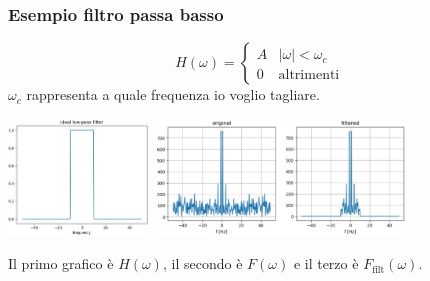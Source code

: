 \documentclass[12pt, a4paper]{report}
\begin{document}
\subsubsection{Esempio filtro passa basso}
\begin{equation*}
    H(\omega)=
    \begin{cases}
        A & \lvert \omega \rvert < \omega_{c} \\
        0 & \text{altrimenti}
    \end{cases}
\end{equation*}
$\omega_{c}$ rappresenta a quale frequenza io voglio tagliare.
\begin{center}
    \includegraphics[width=0.28\textwidth]{Immagini/esfiltropassobasso1.png}
    \includegraphics[width=0.5\textwidth]{Immagini/esfiltropassobasso2.png}
\end{center}
Il primo grafico è $H(\omega)$, il secondo è $F(\omega)$ e il terzo è $F_{\text{filt}}(\omega)$.
\end{document}
